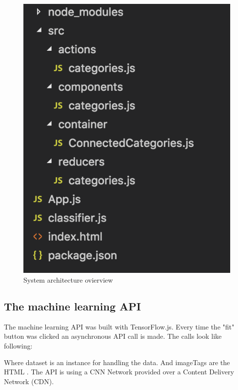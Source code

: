 \begin{figure}[H]
	\centering
	\includegraphics[scale=0.8]{bilder/cyto/SystemArchitecture.png}
	\caption{System architecture ovierview}
	\label{fig:SystemOverview}
\end{figure}


\subsection{The machine learning API}
The machine learning API was built with TensorFlow.js. Every time the "fit" button was clicked an asynchronous API call is made. The calls look like following:



Where dataset is an instance for handling the data. And imageTags are the HTML . The API is using a CNN Network provided over a Content Delivery Network (CDN).









